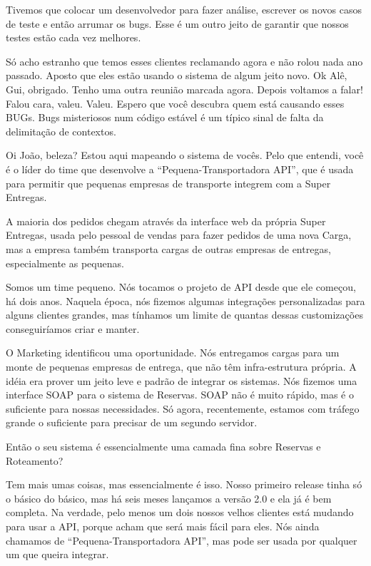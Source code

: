 \documentclass[12pt,play]{article}
\begin{document}
Tivemos que colocar um desenvolvedor para fazer análise, escrever os novos casos de teste e então arrumar os bugs. Esse é um outro jeito de garantir que nossos testes estão cada vez melhores.

Só acho estranho que temos esses clientes reclamando agora e não rolou nada ano passado. Aposto que eles estão usando o sistema de algum jeito novo.
\dani Ok Alê, Gui, obrigado. Tenho uma outra reunião marcada agora. Depois voltamos a falar!
\alex Falou cara, valeu.
\gui Valeu. Espero que você descubra quem está causando esses BUGs.
\narr Bugs misteriosos num código estável é um típico sinal de falta da delimitação de contextos.

\narr {}

\scene
\narr Oi João, beleza? Estou aqui mapeando o sistema de vocês. Pelo que entendi, você é o líder do time que desenvolve a ``Pequena-Transportadora API'', que é usada para permitir que pequenas empresas de transporte integrem com a Super Entregas.

A maioria dos pedidos chegam através da interface web da própria Super Entregas, usada pelo pessoal de vendas para fazer pedidos de uma nova Carga, mas a empresa também transporta cargas de outras empresas de entregas, especialmente as pequenas.

\joao Somos um time pequeno. Nós tocamos o projeto de API desde que ele começou, há dois anos. Naquela época, nós fizemos algumas integrações personalizadas para alguns clientes grandes, mas tínhamos um limite de quantas dessas customizações conseguiríamos criar e manter.

O Marketing identificou uma oportunidade. Nós entregamos cargas para um monte de pequenas empresas de entrega, que não têm infra-estrutura própria. A idéia era prover um jeito leve e padrão de integrar os sistemas. Nós fizemos uma interface SOAP para o sistema de Reservas. SOAP não é muito rápido, mas é o suficiente para nossas necessidades. Só agora, recentemente, estamos com tráfego grande o suficiente para precisar de um segundo servidor.

\dani Então o seu sistema é essencialmente uma camada fina sobre Reservas e Roteamento?

\joao Tem mais umas coisas, mas essencialmente é isso. Nosso primeiro release tinha só o básico do básico, mas há seis meses lançamos a versão 2.0 e ela já é bem completa. Na verdade, pelo menos um dois nossos velhos clientes está mudando para usar a API, porque acham que será mais fácil para eles. Nós ainda chamamos de ``Pequena-Transportadora API'', mas pode ser usada por qualquer um que queira integrar.
\end{document}
